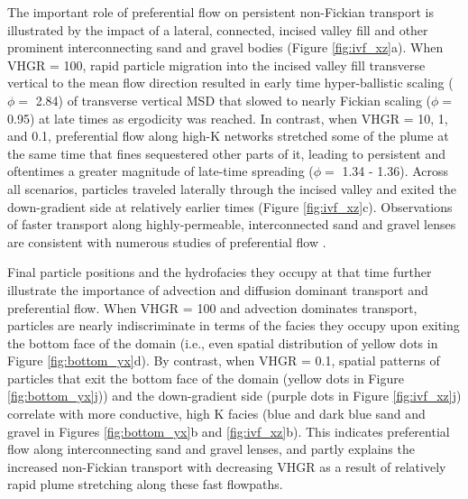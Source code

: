 The important role of preferential flow on persistent non-Fickian transport is illustrated by the impact of a lateral, connected, incised valley fill and other prominent interconnecting sand and gravel bodies (Figure \ref{fig:ivf_xz}a). When VHGR = 100, rapid particle migration into the incised valley fill transverse vertical to the mean flow direction resulted in early time hyper-ballistic scaling ($\phi = $ 2.84) of transverse vertical MSD that slowed to nearly Fickian scaling ($\phi = $ 0.95) at late times as ergodicity was reached. In contrast, when VHGR = 10, 1, and 0.1, preferential flow along high-K networks stretched some of the plume at the same time that fines sequestered other parts of it, leading to persistent and oftentimes a greater magnitude of late-time spreading ($\phi = $ 1.34 - 1.36). Across all scenarios, particles traveled laterally through the incised valley and exited the down-gradient side at relatively earlier times (Figure \ref{fig:ivf_xz}c). Observations of faster transport along highly-permeable, interconnected sand and gravel lenses are consistent with numerous studies of preferential flow \citep{winograd1976major, jussel1994transport, moreno1994flow, tsang1998flow, fogg1986groundwater, heeren2010preferential, maxwell2008contamination, zheng2003analysis, weissmann2004influence, labolle2001role}. 

Final particle positions and the hydrofacies they occupy at that time further illustrate the importance of advection and diffusion dominant transport and preferential flow. When VHGR = 100 and advection dominates transport, particles are nearly indiscriminate in terms of the facies they occupy upon exiting the bottom face of the domain (i.e., even spatial distribution of yellow dots in Figure \ref{fig:bottom_yx}d). By contrast, when VHGR = 0.1, spatial patterns of particles that exit the bottom face of the domain (yellow dots in Figure \ref{fig:bottom_yx}j)) and the down-gradient side (purple dots in Figure \ref{fig:ivf_xz}j) correlate with more conductive, high K facies (blue and dark blue sand and gravel in Figures \ref{fig:bottom_yx}b and \ref{fig:ivf_xz}b). This indicates preferential flow along interconnecting sand and gravel lenses, and partly explains the increased non-Fickian transport with decreasing VHGR as a result of relatively rapid plume stretching along these fast flowpaths. 

